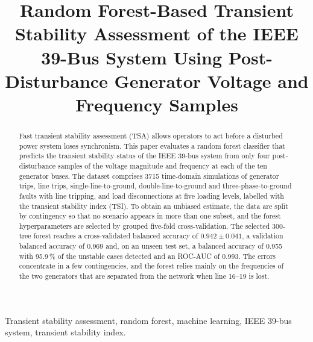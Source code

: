 \documentclass[conference]{IEEEtran}
\begin{document}
\title{Random Forest-Based Transient Stability Assessment of the IEEE 39-Bus System Using Post-Disturbance
Generator Voltage and Frequency Samples}

\author{
\and
{}
}

\maketitle

\begin{abstract}
Fast transient stability assessment (TSA) allows operators to act before a disturbed power system loses synchronism.
This paper evaluates a random forest classifier that predicts the transient stability status of the IEEE 39-bus
system from only four post-disturbance samples of the voltage magnitude and frequency at each of the ten generator
buses. The dataset comprises 3715 time-domain simulations of generator trips, line trips, single-line-to-ground,
double-line-to-ground and three-phase-to-ground faults with line tripping, and load disconnections at five loading
levels, labelled with the transient stability index (TSI). To obtain an unbiased estimate, the data are split by
contingency so that no scenario appears in more than one subset, and the forest hyperparameters are selected by
grouped five-fold cross-validation. The selected 300-tree forest reaches a cross-validated balanced accuracy of
$0.942 \pm 0.041$, a validation balanced accuracy of 0.969 and, on an unseen test set, a balanced accuracy of 0.955
with 95.9\,\% of the unstable cases detected and an ROC-AUC of 0.993. The errors concentrate in a few contingencies,
and the forest relies mainly on the frequencies of the two generators that are separated from the network when line
16--19 is lost.
\end{abstract}

\begin{IEEEkeywords}
Transient stability assessment, random forest, machine learning, IEEE 39-bus system, transient stability index.
\end{IEEEkeywords}
\end{document}
